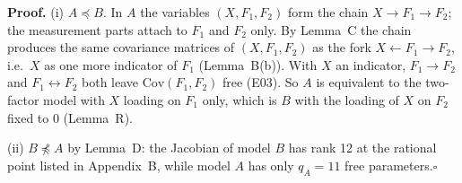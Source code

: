 \documentclass[10pt,a4paper]{article}
\newcommand{\nest}{\preceq}
\newcommand{\nnest}{\not\preceq}
\begin{document}
\noindent\textbf{Proof.} (i) $A\nest B$. In $A$ the variables $(X,F_1,F_2)$ form the chain $X\to F_1\to F_2$; the measurement parts attach to $F_1$ and $F_2$ only. By Lemma~C the chain produces the same covariance matrices of $(X,F_1,F_2)$ as the fork $X\leftarrow F_1\to F_2$, i.e.\ $X$ as one more indicator of $F_1$ (Lemma~B(b)). With $X$ an indicator, $F_1\to F_2$ and $F_1\leftrightarrow F_2$ both leave $\mathrm{Cov}(F_1,F_2)$ free (E03). So $A$ is equivalent to the two-factor model with $X$ loading on $F_1$ only, which is $B$ with the loading of $X$ on $F_2$ fixed to 0 (Lemma~R).\par\smallskip
\noindent(ii) $B\nnest A$ by Lemma~D: the Jacobian of model $B$ has rank 12 at the rational point listed in Appendix~B, while model $A$ has only $q_A=11$ free parameters.\hfill$\square$\par\medskip
{}

\clearpage
\end{document}
